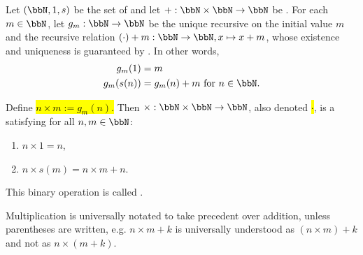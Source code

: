 \begin{proposition} \label{proposition:natural_numbers_multiplication_existence}
Let $(\bbN, 1, s)$ be the set of  and let $+: \bbN \times \bbN \to \bbN$ be . For each $m \in \bbN$, let $g_m: \bbN \to \bbN$ be the unique recursive  on the initial value $m$ and the recursive relation $(\cdot) + m : \bbN \to \bbN, x \mapsto x + m$, whose existence and uniqueness is guaranteed by . In other words,
\begin{align*}
	g_m(1) &= m \\
	g_m(s(n)) &= g_m(n) + m \text{ for } n \in \bbN.
\end{align*}

Define
\hl{$n \times m := g_m(n)$.}
Then $\times: \bbN \times \bbN \to \bbN$, also denoted \hl{$\cdot$}, is a  satisfying for all $n, m \in \bbN$:
\begin{enumerate}
    \item $n \times 1 = n$,
    \item $n \times s(m) = n \times m + n$.
\end{enumerate}
This binary operation is called . 

Multiplication is universally notated to take precedent over addition, unless parentheses are written, e.g. $n \times m + k$ is universally understood as $(n \times m) + k$ and not as $n \times (m+k)$.
\end{proposition}

